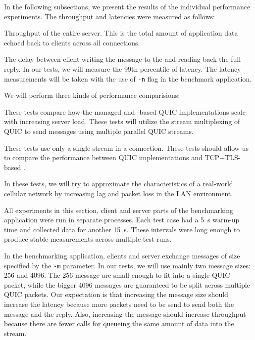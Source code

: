 In the following subsections, we present the results of the individual performance experiments. The
throughput and latencies were measured as follows:

\begin{itemize}

   Throughput of the entire server. This is the total amount of application data
  echoed back to clients across all connections.

   The delay between client writing the message to the \Stream{} and reading back the
full reply. In our tests, we will measure the 99th percentile of latency. The latency measurements
will be taken with the use of \texttt{-n} flag in the benchmark application.

\end{itemize}

We will perform three kinds of performance comparisions:

\begin{itemize}

         These tests compare how the managed and
        \libmsquic{}-based QUIC implementations scale with increasing server load. These tests will
        utilize the stream multiplexing of QUIC to send messages using multiple parallel QUIC
        streams.

         These tests use only a single stream in a connection.
        These tests should allow us to compare the performance between QUIC implementations and
        TCP+TLS-based \SslStream{}.

         In these tests, we will try to approximate
        the characteristics of a real-world cellular network by increasing lag and packet loss in
        the LAN environment.

\end{itemize}

All experiments in this section, client and server parts of the benchmarking application were run in
separate processes. Each test case had a \SI{5}{\second} warm-up time and collected data for another
\SI{15}{\second}. These intervals were long enough to produce stable measurements across multiple
test runs.

In the benchmarking application, clients and server exchange messages of size specified by the
\texttt{-m} parameter. In our tests, we will use mainly two message sizes: \SI{256}{\byte} and
\SI{4096}{\byte}. The \SI{256}{\byte} message are small enough to fit into a single QUIC packet,
while the bigger \SI{4096}{\byte} messages are guaranteed to be split across multiple QUIC packets.
Our expectation is that increasing the message size should increase the latency because more packets
need to be send to send both the message and the reply. Also, increasing the message should increase
throughput because there are fewer calls for queueing the same amount of data into the stream.

